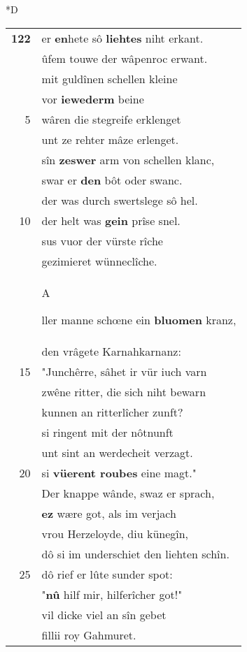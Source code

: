 \documentclass[8pt,a4paper,notitlepage]{article}
\begin{document}
\begin{table}[ht]
\begin{minipage}[t]{0.5\linewidth}
\small
\begin{center}*D
\end{center}
\begin{tabular}{rl}
\textbf{122} & er \textbf{en}hete sô \textbf{liehtes} niht erkant.\\ 
 & ûfem touwe der wâpenroc erwant.\\ 
 & mit guldînen schellen kleine\\ 
 & vor \textbf{iewederm} beine\\ 
5 & wâren die stegreife erklenget\\ 
 & unt ze rehter mâze erlenget.\\ 
 & sîn \textbf{zeswer} arm von schellen klanc,\\ 
 & swar er \textbf{den} bôt oder swanc.\\ 
 & der was durch swertslege sô hel.\\ 
10 & der helt was \textbf{gein} prîse snel.\\ 
 & sus vuor der vürste rîche\\ 
 & gezimieret wünneclîche.\\ 
 & \begin{large}A\end{large}ller manne schœne ein \textbf{bluomen} kranz,\\ 
 & den vrâgete Karnahkarnanz:\\ 
15 & "Junchêrre, sâhet ir vür iuch varn\\ 
 & zwêne ritter, die sich niht bewarn\\ 
 & kunnen an ritterlîcher zunft?\\ 
 & si ringent mit der nôtnunft\\ 
 & unt sint an werdecheit verzagt.\\ 
20 & si \textbf{vüerent roubes} eine magt."\\ 
 & Der knappe wânde, swaz er sprach,\\ 
 & \textbf{ez} wære got, als im verjach\\ 
 & vrou Herzeloyde, diu künegîn,\\ 
 & dô si im underschiet den liehten schîn.\\ 
25 & dô rief er lûte sunder spot:\\ 
 & "\textbf{nû} hilf mir, hilferîcher got!"\\ 
 & vil dicke viel an sîn gebet\\ 
 & fillii roy Gahmuret.\\ 

\end{tabular}
\end{minipage}
\end{table}
\end{document}
